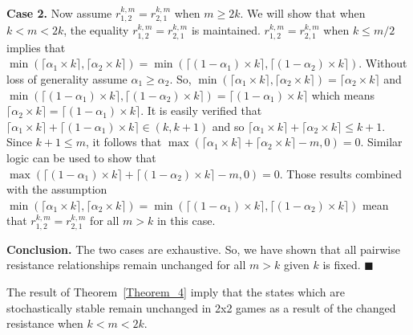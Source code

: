 \documentclass[11.5pt]{article}
\begin{document}
{\bf Case 2.} Now assume $r^{k,m}_{1,2} = r^{k,m}_{2,1}$ when $m \geq 2k$. We will show that when $k < m < 2k$, the equality $r^{k,m}_{1,2} = r^{k,m}_{2,1}$ is maintained. $r^{k,m}_{1,2} = r^{k,m}_{2,1}$ when $k \leq m/2$ implies that $\min(\lceil \alpha_1 \times k \rceil,\lceil \alpha_2 \times k \rceil) = \min(\lceil (1-\alpha_1) \times k \rceil,\lceil (1-\alpha_2) \times k \rceil)$. Without loss of generality assume $\alpha_1\geq \alpha_2$. So, $\min(\lceil \alpha_1 \times k \rceil,\lceil \alpha_2 \times k \rceil) = \lceil \alpha_2 \times k \rceil$ and $\min(\lceil (1-\alpha_1) \times k \rceil,\lceil (1-\alpha_2) \times k \rceil) = \lceil (1-\alpha_1) \times k \rceil$ which means $\lceil \alpha_2 \times k \rceil = \lceil (1-\alpha_1) \times k \rceil$. It is easily verified that $\lceil \alpha_1 \times k \rceil+\lceil (1-\alpha_1) \times k \rceil \in (k, k+1)$ and so $\lceil \alpha_1 \times k \rceil+\lceil \alpha_2 \times k \rceil \leq k+1$. Since $k+1 \leq m$, it follows that $\max(\lceil \alpha_1 \times k \rceil+\lceil \alpha_2 \times k \rceil-m,0) = 0$. Similar logic can be used to show that $\max(\lceil (1-\alpha_1) \times k \rceil+\lceil (1-\alpha_2) \times k \rceil-m,0) = 0$. Those results combined with the assumption $\min(\lceil \alpha_1 \times k \rceil,\lceil \alpha_2 \times k \rceil) = \min(\lceil (1-\alpha_1) \times k \rceil,\lceil (1-\alpha_2) \times k \rceil)$ mean that $r^{k,m}_{1,2} = r^{k,m}_{2,1}$ for all $m > k$ in this case.

{\bf Conclusion.} The two cases are exhaustive. So, we have shown that all pairwise resistance relationships remain unchanged for all $m > k$ given $k$ is fixed.
$\blacksquare$

The result of Theorem~\ref{Theorem_4} imply that the states which are stochastically stable remain unchanged in 2x2 games as a result of the changed resistance when $k<m<2k$.
\end{document}
